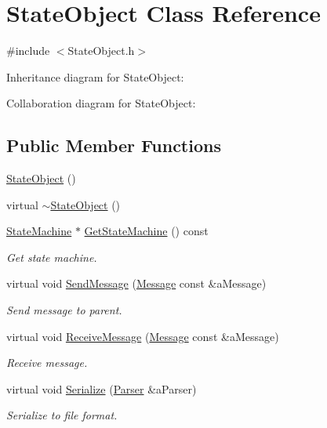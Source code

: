 \hypertarget{classStateObject}{}\section{State\+Object Class Reference}
\label{classStateObject}


{\ttfamily \#include $<$State\+Object.\+h$>$}



Inheritance diagram for State\+Object\+:


Collaboration diagram for State\+Object\+:
\subsection*{Public Member Functions}
\begin{DoxyCompactItemize}
\item 
\hyperlink{classStateObject_a2a4f677241370a9650586369a7173c8b}{State\+Object} ()
\item 
virtual \hyperlink{classStateObject_ae4e97e7674985125e4d6889891d1f56f}{$\sim$\+State\+Object} ()
\item 
\hyperlink{classStateMachine}{State\+Machine} $\ast$ \hyperlink{classStateObject_a967c691955beb9a8a01f76e284c571d7}{Get\+State\+Machine} () const 
\begin{DoxyCompactList}\small\item\em Get state machine. \end{DoxyCompactList}\item 
virtual void \hyperlink{classStateObject_a4093cde1756c8580067e121740396eb0}{Send\+Message} (\hyperlink{classMessage}{Message} const \&a\+Message)
\begin{DoxyCompactList}\small\item\em Send message to parent. \end{DoxyCompactList}\item 
virtual void \hyperlink{classStateObject_ac861388d961e1de6e57b168b5ee93b96}{Receive\+Message} (\hyperlink{classMessage}{Message} const \&a\+Message)
\begin{DoxyCompactList}\small\item\em Receive message. \end{DoxyCompactList}\item 
virtual void \hyperlink{classStateObject_a6f824bbb81a19e26abaa5156b29941ab}{Serialize} (\hyperlink{classParser}{Parser} \&a\+Parser)
\begin{DoxyCompactList}\small\item\em Serialize to file format. \end{DoxyCompactList}\item 

\end{DoxyCompactItemize}
